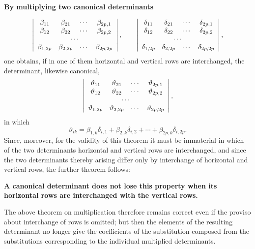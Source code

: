 \documentclass[10pt]{article}
\begin{document}
\begin{center}
\textbf{By multiplying two canonical determinants}
\end{center}
\[
\left|\begin{array}{cccc}
\beta_{11}&\beta_{21}&\cdots&\beta_{2p,1}\\
\beta_{12}&\beta_{22}&\cdots&\beta_{2p,2}\\
\multicolumn{4}{c}{\cdots}\\
\beta_{1,2p}&\beta_{2,2p}&\cdots&\beta_{2p,2p}
\end{array}\right|,
\qquad
\left|\begin{array}{cccc}
\delta_{11}&\delta_{21}&\cdots&\delta_{2p,1}\\
\delta_{12}&\delta_{22}&\cdots&\delta_{2p,2}\\
\multicolumn{4}{c}{\cdots}\\
\delta_{1,2p}&\delta_{2,2p}&\cdots&\delta_{2p,2p}
\end{array}\right|,
\]
one obtains, if in one of them horizontal and vertical rows are interchanged, the determinant, likewise canonical,
\[
\left|\begin{array}{cccc}
\vartheta_{11}&\vartheta_{21}&\cdots&\vartheta_{2p,1}\\
\vartheta_{12}&\vartheta_{22}&\cdots&\vartheta_{2p,2}\\
\multicolumn{4}{c}{\cdots}\\
\vartheta_{1,2p}&\vartheta_{2,2p}&\cdots&\vartheta_{2p,2p}
\end{array}\right|,
\]
in which
\[
\vartheta_{ik}=\beta_{1,k}\delta_{i,1}+\beta_{2,k}\delta_{i,2}+\cdots+\beta_{2p,k}\delta_{i,2p}.
\]
Since, moreover, for the validity of this theorem it must be immaterial in which of the two determinants horizontal and vertical rows are interchanged, and since the two determinants thereby arising differ only by interchange of horizontal and vertical rows, the further theorem follows:

\begin{center}
\textbf{A canonical determinant does not lose this property when its horizontal rows are interchanged with the vertical rows.}
\end{center}

The above theorem on multiplication therefore remains correct even if the proviso about interchange of rows is omitted; but then the elements of the resulting determinant no longer give the coefficients of the substitution composed from the substitutions corresponding to the individual multiplied determinants.
\end{document}
